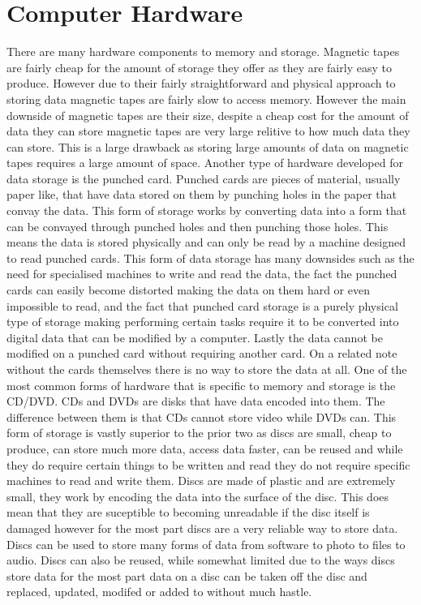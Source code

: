 \documentclass{article}
\begin{document}
\section{Computer Hardware}
There are many hardware components to memory and storage. Magnetic tapes are fairly cheap for the amount of storage they offer as they are fairly easy to produce. However due to their fairly straightforward and physical approach to storing data magnetic tapes are fairly slow to access memory. However the main downside of magnetic tapes are their size, despite a cheap cost for the amount of data they can store magnetic tapes are very large relitive to how much data they can store. This is a large drawback as storing large amounts of data on magnetic tapes requires a large amount of space.
Another type of hardware developed for data storage is the punched card. Punched cards are pieces of material, usually paper like, that have data stored on them by punching holes in the paper that convay the data. This form of storage works by converting data into a form that can be convayed through punched holes and then punching those holes. This means the data is stored physically and can only be read by a machine designed to read punched cards. This form of data storage has many downsides such as the need for specialised machines to write and read the data, the fact the punched cards can easily become distorted making the data on them hard or even impossible to read, and the fact that punched card storage is a purely physical type of storage making performing certain tasks require it to be converted into digital data that can be modified by a computer. Lastly the data cannot be modified on a punched card without requiring another card. On a related note without the cards themselves there is no way to store the data at all.
One of the most common forms of hardware that is specific to memory and storage is the CD/DVD. CDs and DVDs are disks that have data encoded into them. The difference between them is that CDs cannot store video while DVDs can. This form of storage is vastly superior to the prior two as discs are small, cheap to produce, can store much more data, access data faster, can be reused and while they do require certain things to be written and read they do not require specific machines to read and write them. Discs are made of plastic and are extremely small, they work by encoding the data into the surface of the disc. This does mean that they are suceptible to becoming unreadable if the disc itself is damaged however for the most part discs are a very reliable way to store data. Discs can be used to store many forms of data from software to photo to files to audio. Discs can also be reused, while somewhat limited due to the ways discs store data for the most part data on a disc can be taken off the disc and replaced, updated, modifed or added to without much hastle.
\end{document}
